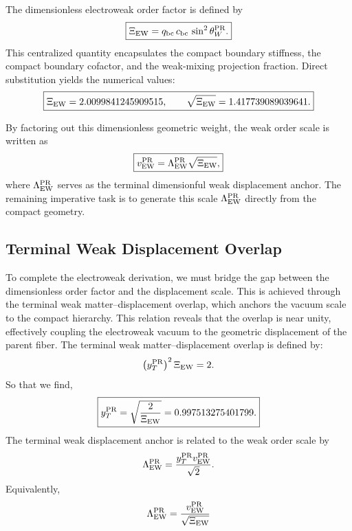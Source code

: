 \documentclass[11pt]{article}
\begin{document}
The dimensionless electroweak order factor is defined by
\begin{equation}
\boxed{
\Xi_{\rm EW}
=
q_{\rm bc}\,c_{\rm bc}\,\sin^2\theta_W^{\rm PR}.
}
\end{equation}
This centralized quantity encapsulates the compact boundary stiffness, the compact boundary cofactor, and the weak-mixing projection fraction. Direct substitution yields the numerical values:
\begin{equation}
\boxed{
\Xi_{\rm EW} = 2.0099841245909515,
\qquad
\sqrt{\Xi_{\rm EW}} = 1.417739089039641.
}
\end{equation}

By factoring out this dimensionless geometric weight, the weak order scale is written as
\begin{equation}
\boxed{
v_{\rm EW}^{\rm PR}
=
\Lambda_{\rm EW}^{\rm PR}
\sqrt{\Xi_{\rm EW}},
}
\end{equation}
where \(\Lambda_{\rm EW}^{\rm PR}\) serves as the terminal dimensionful weak displacement anchor. The remaining imperative task is to generate this scale \(\Lambda_{\rm EW}^{\rm PR}\) directly from the compact geometry.

\subsection{Terminal Weak Displacement Overlap}
\label{sec:pr2_terminal_weak_displacement_overlap}

To complete the electroweak derivation, we must bridge the gap between the dimensionless order factor and the displacement scale. This is achieved through the terminal weak matter--displacement overlap, which anchors the vacuum scale to the compact hierarchy. This relation reveals that the overlap is near unity, effectively coupling the electroweak vacuum to the geometric displacement of the parent fiber. The terminal weak matter--displacement overlap is defined by:
\begin{equation}
\left(y_T^{\rm PR}\right)^2 \Xi_{\rm EW} = 2.
\end{equation}
So that we find,
\begin{equation}
\boxed{
y_T^{\rm PR}
=
\sqrt{
\frac{2}{\Xi_{\rm EW}}
}
=
0.997513275401799.
}
\end{equation}
The terminal weak displacement anchor is related to the weak order scale by
\begin{equation}
\Lambda_{\rm EW}^{\rm PR}
=
\frac{
y_T^{\rm PR}v_{\rm EW}^{\rm PR}
}{\sqrt2}.
\end{equation}
Equivalently,
\begin{equation}
\Lambda_{\rm EW}^{\rm PR}
=
\frac{
v_{\rm EW}^{\rm PR}
}{
\sqrt{\Xi_{\rm EW}}
}
\end{equation}
\end{document}
